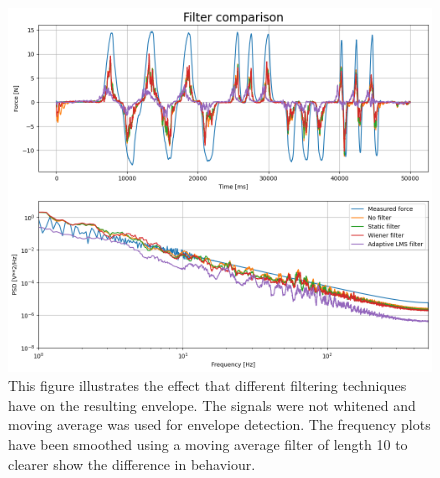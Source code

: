 \begin{figure}[h!t]
	\begin{center}
		\includegraphics[width=1.0\columnwidth]{images/measurement_filtering.png}
	\end{center}
	\caption{This figure illustrates the effect that different filtering techniques have on the resulting envelope. The signals were not whitened and moving average was used for envelope detection. The frequency plots have been smoothed using a moving average filter of length 10 to clearer show the difference in behaviour.}
	\label{fig:result_filtering}
\end{figure}


